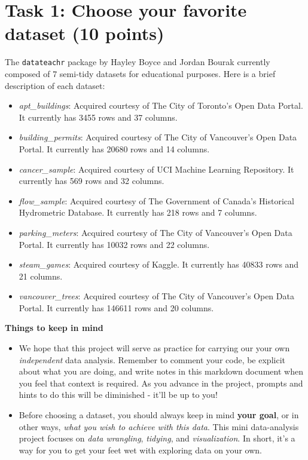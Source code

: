 \documentclass[
]{article}
\begin{document}
\hypertarget{task-1-choose-your-favorite-dataset-10-points}{%
\section{Task 1: Choose your favorite dataset (10
points)}\label{task-1-choose-your-favorite-dataset-10-points}}

The \texttt{datateachr} package by Hayley Boyce and Jordan Bourak
currently composed of 7 semi-tidy datasets for educational purposes.
Here is a brief description of each dataset:

\begin{itemize}
\item
  \emph{apt\_buildings}: Acquired courtesy of The City of Toronto's Open
  Data Portal. It currently has 3455 rows and 37 columns.
\item
  \emph{building\_permits}: Acquired courtesy of The City of Vancouver's
  Open Data Portal. It currently has 20680 rows and 14 columns.
\item
  \emph{cancer\_sample}: Acquired courtesy of UCI Machine Learning
  Repository. It currently has 569 rows and 32 columns.
\item
  \emph{flow\_sample}: Acquired courtesy of The Government of Canada's
  Historical Hydrometric Database. It currently has 218 rows and 7
  columns.
\item
  \emph{parking\_meters}: Acquired courtesy of The City of Vancouver's
  Open Data Portal. It currently has 10032 rows and 22 columns.
\item
  \emph{steam\_games}: Acquired courtesy of Kaggle. It currently has
  40833 rows and 21 columns.
\item
  \emph{vancouver\_trees}: Acquired courtesy of The City of Vancouver's
  Open Data Portal. It currently has 146611 rows and 20 columns.
\end{itemize}

\textbf{Things to keep in mind}

\begin{itemize}
\item
  We hope that this project will serve as practice for carrying our your
  own \emph{independent} data analysis. Remember to comment your code,
  be explicit about what you are doing, and write notes in this markdown
  document when you feel that context is required. As you advance in the
  project, prompts and hints to do this will be diminished - it'll be up
  to you!
\item
  Before choosing a dataset, you should always keep in mind \textbf{your
  goal}, or in other ways, \emph{what you wish to achieve with this
  data}. This mini data-analysis project focuses on \emph{data
  wrangling}, \emph{tidying}, and \emph{visualization}. In short, it's a
  way for you to get your feet wet with exploring data on your own.
\end{itemize}
\end{document}
